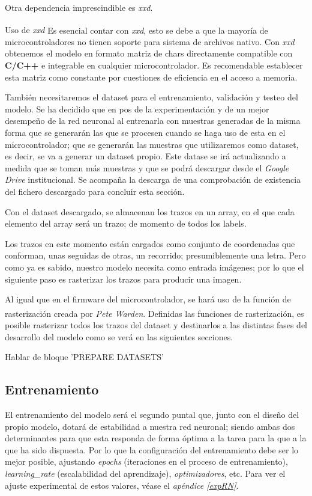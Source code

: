 Otra dependencia imprescindible es \textit{xxd}.
\begin{teoria}{Uso de \textit{xxd}\textsuperscript{\cite{tf-xxd}}}
    \color{mitexto}
    Es esencial contar con \textit{xxd}, esto se debe a que la mayoría de
    microcontroladores no tienen soporte para sistema de archivos nativo.
    Con \textit{xxd} obtenemos el modelo en formato matriz de chars directamente
    compatible con \textbf{C/C++} e integrable en cualquier microcontrolador.\newline
    Es recomendable establecer esta matriz como constante por cuestiones de
    eficiencia en el acceso a memoria.
\end{teoria}
\newpage

También necesitaremos el dataset para el entrenamiento, validación y testeo
del modelo. Se ha decidido que en pos de la experimentación y de un mejor desempeño
de la red neuronal al entrenarla con muestras generadas de la misma forma que se generarán
las que se procesen cuando se haga uso de esta en el microcontrolador; que se generarán
las muestras que utilizaremos como dataset, es decir, se va a generar un dataset propio.
Este datase se irá
actualizando a medida que se toman más muestras y que se podrá descargar
desde el \textit{Google Drive} institucional. Se acompaña la descarga de una comprobación
de existencia del fichero descargado para concluir esta sección.

Con el dataset descargado, se almacenan los trazos en un array, en el que
cada elemento del array será un trazo; de momento de todos los labels.

Los trazos en este momento están cargados como conjunto de coordenadas que
conforman, unas seguidas de otras, un recorrido; presumiblemente una letra.
Pero como ya es sabido, nuestro modelo necesita como entrada imágenes; por lo que
el siguiente paso es rasterizar los trazos para producir una imagen.

Al igual que en el firmware del microcontrolador, se hará uso de la función de rasterización creada
por \textit{Pete Warden}\textsuperscript{\cite{petewardenmw}}. Definidas las funciones de
rasterización, es posible rasterizar todos los trazos del dataset y destinarlos a las distintas
fases del desarrollo del modelo como se verá en las siguientes secciones.

{\color{red}Hablar de bloque 'PREPARE DATASETS'}

\subsection{Entrenamiento}
El entrenamiento del modelo será el segundo puntal que, junto con el diseño del
propio modelo, dotará de estabilidad a nuestra red neuronal; siendo ambas dos
determinantes para que esta responda de forma óptima a la tarea para la que a
la que ha sido dispuesta.
Por lo que la configuración del entrenamiento debe ser lo mejor posible, ajustando
\textit{epochs} (iteraciones en el proceso de entrenamiento), \textit{learning\_rate}
(escalabilidad del aprendizaje), \textit{optimizadores}, etc.
Para ver el ajuste experimental de estos valores, véase el \textit{apéndice \ref{expRN}}.

